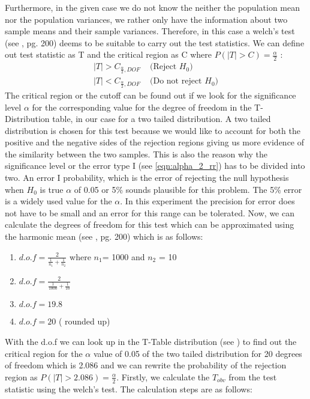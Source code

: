 Furthermore, in the given case we do not know the neither the population mean nor the population variances, we rather only have the information about two sample means and their sample variances. Therefore, in this case a welch's test (see \cite{hogg:2005}, pg. 200) deems to be suitable to carry out the test statistics. We can define out test statistic as T and the critical region as C where $P(|T| > C) =\frac{\alpha}{2}$ \label{eqn:alpha_2_rr}:
\begin{equation}
    \begin{split}
      |T| > C_{\frac{\alpha}{2}, DOF}& \text{ (Reject $H_0$)}\\
      |T| < C_{\frac{\alpha}{2}, DOF}& \text{ (Do not reject $H_0$)}
    \end{split}
\end{equation}
The critical region or the cutoff can be found out if we look for the significance level $\alpha$ for the corresponding value for the degree of freedom in the T-Distribution table, in our case for a two tailed distribution. A two tailed distribution is chosen for this test because we would like to account for both the positive and the negative sides of the rejection regions giving us more evidence of the similarity between the two samples. This is also the reason why the significance level or the error type I (see \ref{eqn:alpha_2_rr}) has to be divided into two. \newline \newline
An error I probability, which is the error of rejecting the null hypothesis when $H_0$ is true $\alpha$ of 0.05 or 5\% sounds plausible for this problem. The 5\% error is a widely used value for the $\alpha$. In this experiment the precision for error does not have to be small and an error for this range can be tolerated. Now, we can calculate the degrees of freedom for this test which can be approximated using the harmonic mean (see \cite{Iubh:2021}, pg. 200) which is as follows:
\begin{enumerate}
    \item $d.o.f = \frac{2}{\frac{1}{n_1}+\frac{1}{n_2}}$ where $n_1$= 1000 and $n_2$ = 10
    \item $d.o.f = \frac{2}{\frac{1}{1000}+\frac{1}{10}}$
    \item $d.o.f = 19.8$
    \item $d.o.f = 20$ ( rounded up)
\end{enumerate}
With the d.o.f we can look up in the T-Table distribution (see \cite{t-table}) to find out the critical region for the $\alpha$ value of 0.05 of the two tailed distribution for 20 degrees of freedom which is 2.086 and we can rewrite the probability of the rejection region as $P(|T| > 2.086) = \frac{\alpha}{2}$. Firstly, we calculate the $T_{obv}$ from the test statistic using the welch's test. The calculation steps are as follows:
